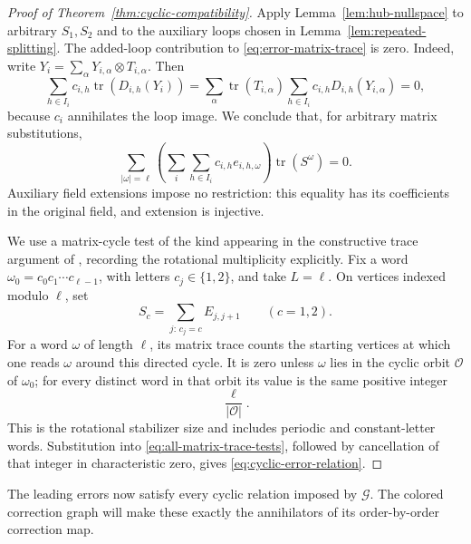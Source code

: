 \begin{proof}[Proof of Theorem~\ref{thm:cyclic-compatibility}]
Apply Lemma~\ref{lem:hub-nullspace} to arbitrary \(S_1,S_2\)
and to the auxiliary loops chosen in
Lemma~\ref{lem:repeated-splitting}. The added-loop contribution
to \eqref{eq:error-matrix-trace} is zero. Indeed, write
\(Y_i=\sum_\alpha Y_{i,\alpha}\otimes T_{i,\alpha}\). Then
\[
 \sum_{h\in I_i}c_{i,h}\operatorname{tr}(D_{i,h}(Y_i))
 =\sum_\alpha\operatorname{tr}(T_{i,\alpha})
      \sum_{h\in I_i}c_{i,h}D_{i,h}(Y_{i,\alpha})=0,
\]
because \(c_i\) annihilates the loop image. We conclude that,
for arbitrary matrix substitutions,
\begin{equation}
 \sum_{|\omega|=\ell}
 \left(\sum_i\sum_{h\in I_i}c_{i,h}e_{i,h,\omega}\right)
 \operatorname{tr}(S^\omega)=0.
 \label{eq:all-matrix-trace-tests}
\end{equation}
Auxiliary field extensions impose no restriction: this equality
has its coefficients in the original field, and extension is
injective.

We use a matrix-cycle test of the kind appearing in the constructive
trace argument of \cite[Proposition~4.1]{KlepSpenko2014}, recording the
rotational multiplicity explicitly. Fix a word
\(\omega_0=c_0c_1\cdots c_{\ell-1}\), with letters
\(c_j\in\{1,2\}\), and take \(L=\ell\). On vertices indexed
modulo \(\ell\), set
\[
 S_c=\sum_{j:\,c_j=c}E_{j,j+1}\qquad(c=1,2).
\]
For a word \(\omega\) of length \(\ell\), its matrix trace
counts the starting vertices at which one reads \(\omega\)
around this directed cycle. It is zero unless \(\omega\) lies
in the cyclic orbit \(\mathcal O\) of \(\omega_0\); for every
distinct word in that orbit its value is the same positive integer
\[
 \frac{\ell}{|\mathcal O|}.
\]
This is the rotational stabilizer size and includes periodic and
constant-letter words. Substitution into
\eqref{eq:all-matrix-trace-tests}, followed by cancellation of that
integer in characteristic zero, gives
\eqref{eq:cyclic-error-relation}.
\end{proof}

The leading errors now satisfy every cyclic relation imposed by
\(\mathcal G\). The colored correction graph will make these
exactly the annihilators of its order-by-order correction map.
